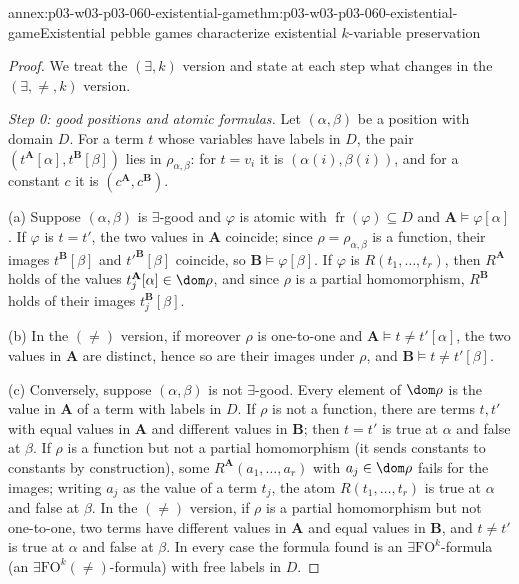 \begin{annexitem}{annex:p03-w03-p03-060-existential-game}{thm:p03-w03-p03-060-existential-game}{Existential pebble games characterize existential \(k\)-variable preservation}
\begin{proof}
We treat the \((\exists,k)\) version and state at each step what changes in
the \((\exists,\neq,k)\) version.

\emph{Step 0: good positions and atomic formulas.} Let \((\alpha,\beta)\) be
a position with domain \(D\). For a term \(t\) whose variables have labels
in \(D\), the pair \((t^{\mathbf A}[\alpha],t^{\mathbf B}[\beta])\) lies in
\(\rho_{\alpha,\beta}\): for \(t=v_i\) it is \((\alpha(i),\beta(i))\), and
for a constant \(c\) it is \((c^{\mathbf A},c^{\mathbf B})\).

(a) Suppose \((\alpha,\beta)\) is \(\exists\)-good and \(\varphi\) is atomic
with \(\operatorname{fr}(\varphi)\subseteq D\) and
\(\mathbf A\models\varphi[\alpha]\). If \(\varphi\) is \(t=t'\), the two
values in \(\mathbf A\) coincide; since \(\rho=\rho_{\alpha,\beta}\) is a
function, their images \(t^{\mathbf B}[\beta]\) and \(t'^{\mathbf B}[\beta]\)
coincide, so \(\mathbf B\models\varphi[\beta]\). If \(\varphi\) is
\(R(t_1,\ldots,t_r)\), then \(R^{\mathbf A}\) holds of the values
\(t_j^{\mathbf A}[\alpha]\in\dom\rho\), and since \(\rho\) is a partial
homomorphism, \(R^{\mathbf B}\) holds of their images
\(t_j^{\mathbf B}[\beta]\).

(b) In the \((\neq)\) version, if moreover \(\rho\) is one-to-one and
\(\mathbf A\models t\neq t'[\alpha]\), the two values in \(\mathbf A\) are
distinct, hence so are their images under \(\rho\), and
\(\mathbf B\models t\neq t'[\beta]\).

(c) Conversely, suppose \((\alpha,\beta)\) is not \(\exists\)-good. Every
element of \(\dom\rho\) is the value in \(\mathbf A\) of a term with labels
in \(D\). If \(\rho\) is not a function, there are terms \(t,t'\) with equal
values in \(\mathbf A\) and different values in \(\mathbf B\); then
\(t=t'\) is true at \(\alpha\) and false at \(\beta\). If \(\rho\) is a
function but not a partial homomorphism (it sends constants to constants by
construction), some \(R^{\mathbf A}(a_1,\ldots,a_r)\) with
\(a_j\in\dom\rho\) fails for the images; writing \(a_j\) as the value of a
term \(t_j\), the atom \(R(t_1,\ldots,t_r)\) is true at \(\alpha\) and false
at \(\beta\). In the \((\neq)\) version, if \(\rho\) is a partial
homomorphism but not one-to-one, two terms have different values in
\(\mathbf A\) and equal values in \(\mathbf B\), and \(t\neq t'\) is true at
\(\alpha\) and false at \(\beta\). In every case the formula found is an
\(\exists\mathrm{FO}^k\)-formula (an \(\exists\mathrm{FO}^k(\neq)\)-formula)
with free labels in \(D\).


\end{proof}
\end{annexitem}
